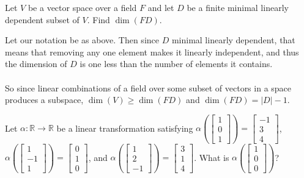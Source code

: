 \documentclass{article}
\begin{document}
\setcounter{problem}{231}
\begin{problem}
Let $V$ be a vector space over a field $F$ and let $D$ be a finite minimal linearly dependent subset of $V$. Find $\dim(FD)$.
\end{problem}

\begin{solution}
Let our notation be as above. Then since $D$ minimal linearly dependent, that means that removing any one element makes it linearly independent, and thus the dimension of $D$ is one less than the number of elements it contains.

\paragraph{}
So since linear combinations of a field over some subset of vectors in a space produces a subspace,
$\dim(V)\ge\dim(FD)$ and $\dim(FD) = |D| -1$.
\end{solution}

\setcounter{section}{6}
\setcounter{problem}{233}
\begin{problem}
Let $\alpha:\mathbb{R}\to\mathbb{R}$ be a linear transformation satisfying $\alpha\left(\begin{bmatrix}
1\\0\\1
\end{bmatrix}\right)=\begin{bmatrix}
-1\\3\\4
\end{bmatrix}$, $\alpha\left(\begin{bmatrix}
1\\-1\\1
\end{bmatrix}\right)=\begin{bmatrix}
0\\1\\0
\end{bmatrix}$, and $\alpha\left(\begin{bmatrix}
1\\2\\-1
\end{bmatrix}\right)=\begin{bmatrix}
3\\1\\4
\end{bmatrix}$. What is $\alpha\left( \begin{bmatrix} 1\\0\\0 \end{bmatrix} \right)$?
\end{problem}
\end{document}
